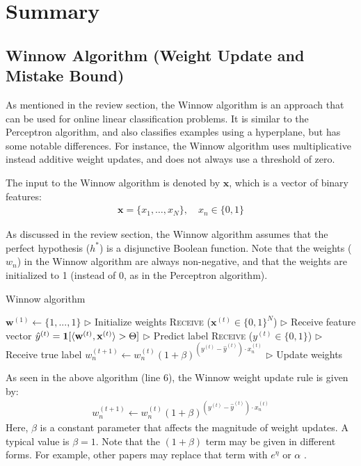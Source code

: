 \documentclass[11pt]{article}
\begin{document}
\section{Summary}
\subsection{Winnow Algorithm (Weight Update and Mistake Bound)}
\label{sec:winnow_algo}
As mentioned in the review section, the Winnow algorithm is an approach that can be used for online linear classification problems. It is similar to the Perceptron algorithm, and also classifies examples using a hyperplane, but has some notable differences. For instance, the Winnow algorithm uses multiplicative instead additive weight updates, and does not always use a threshold of zero.

The input to the Winnow algorithm is denoted by $\boldsymbol{x}$, which is a vector of binary features:
\begin{align}
    \boldsymbol{x} = \{x_1, \dots, x_N\}, \quad x_n \in \{0,1\}
\end{align}

As discussed in the review section, the Winnow algorithm assumes that the perfect hypothesis ($h^*$) is a disjunctive Boolean function. Note that the weights ($w_n$) in the Winnow algorithm are always non-negative, and that the weights are initialized to 1 (instead of 0, as in the Perceptron algorithm).


\begin{algorithm}[H]
\caption{Winnow algorithm}
\label{algo:winnow}
\begin{algorithmic}[1]
\STATE $\textbf{w}^{(1)} \leftarrow \{1,...,1\}$ \hfill $\triangleright$ Initialize weights
\STATE \textsc{Receive} ($\textbf{x}^{(t)} \in\{0, 1\}^N$) \hfill $\triangleright$ Receive feature vector
\STATE $\hat{y}^{(t)} = \textbf{1}[\langle \textbf w^{(t)}, \textbf x^{(t)}\rangle>\Theta]$ \hfill $\triangleright$ Predict label
\STATE \textsc{Receive} ($y^{(t)}\in\{0, 1\}$) \hfill $\triangleright$ Receive true label
\STATE $w_n^{(t+1)}\leftarrow w_n^{(t)} (1+\beta)^{ (y^{(t)}-\hat{y}^{(t)})\cdot x_n^{(t)}} $ \hfill $\triangleright$ Update weights
\ENDFOR
\end{algorithmic}\label{algo:winnow}
\end{algorithm}


As seen in the above algorithm (line 6), the Winnow weight update rule is given by:
\begin{align}
    w_n^{(t+1)}\leftarrow w_n^{(t)} (1+\beta)^{ (y^{(t)}-\hat{y}^{(t)})\cdot x_n^{(t)}}
\end{align}
Here, $\beta$ is a constant parameter that affects the magnitude of weight updates. A typical value \cite{littlestone1988winnow} is $\beta=1$. Note that the $(1+\beta)$ term may be given in different forms. For example, other papers may replace that term with $e^\eta$ or $\alpha$ \cite{littlestone1988winnow}.
\end{document}
